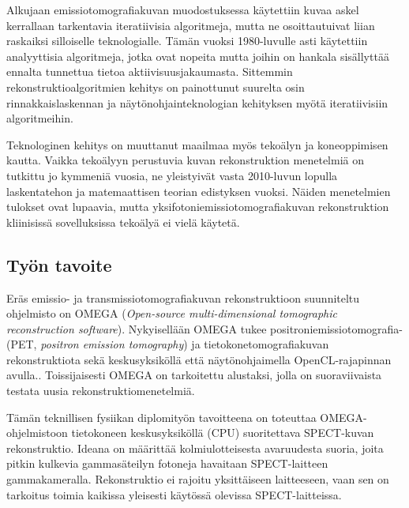 Alkujaan emissiotomografiakuvan muodostuksessa käytettiin kuvaa askel kerrallaan tarkentavia iteratiivisia algoritmeja, mutta ne osoittautuivat liian raskaiksi silloiselle teknologialle. Tämän vuoksi 1980-luvulle asti käytettiin analyyttisia algoritmeja, jotka ovat nopeita mutta joihin on hankala sisällyttää ennalta tunnettua tietoa aktiivisuusjakaumasta. Sittemmin rekonstruktioalgoritmien kehitys on painottunut suurelta osin rinnakkaislaskennan ja näytönohjainteknologian kehityksen myötä iteratiivisiin algoritmeihin.\cite{bruyant_analytic_2002} 

Teknologinen kehitys on muuttanut maailmaa myös tekoälyn ja koneoppimisen kautta. Vaikka tekoälyyn perustuvia kuvan rekonstruktion menetelmiä on tutkittu jo kymmeniä vuosia, ne yleistyivät vasta 2010-luvun lopulla laskentatehon ja matemaattisen teorian edistyksen vuoksi. Näiden menetelmien tulokset ovat lupaavia, mutta yksifotoniemissiotomografiakuvan rekonstruktion kliinisissä sovelluksissa tekoälyä ei vielä käytetä.\cite{shao_artificial_2021}

\subsection{Työn tavoite}
Eräs emissio- ja transmissiotomografiakuvan rekonstruktioon suunniteltu ohjelmisto on OMEGA (\textit{Open-source multi-dimensional tomographic reconstruction software}). Nykyisellään OMEGA tukee positroniemissiotomografia- (PET, \textit{positron emission tomography}) ja tietokonetomografiakuvan rekonstruktiota sekä keskusyksiköllä että näytönohjaimella OpenCL-rajapinnan avulla.\cite{wettenhovi_omegaopen-source_2021}. Toissijaisesti OMEGA on tarkoitettu alustaksi, jolla on suoraviivaista testata uusia rekonstruktiomenetelmiä. 

Tämän teknillisen fysiikan diplomityön tavoitteena on toteuttaa OMEGA-ohjelmistoon tietokoneen keskusyksiköllä (CPU) suoritettava SPECT-kuvan rekonstruktio. Ideana on määrittää kolmiulotteisesta avaruudesta suoria, joita pitkin kulkevia gammasäteilyn fotoneja havaitaan SPECT-laitteen gammakameralla. Rekonstruktio ei rajoitu yksittäiseen laitteeseen, vaan sen on tarkoitus toimia kaikissa yleisesti käytössä olevissa SPECT-laitteissa.